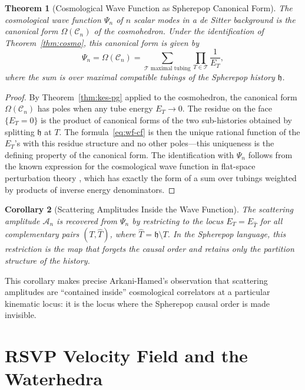 \documentclass[12pt, oneside]{amsart}
\theoremstyle{plain}
\newtheorem{theorem}{Theorem}[section]
\newtheorem{corollary}[theorem]{Corollary}
\theoremstyle{definition}
\theoremstyle{remark}
\newcommand{\hist}{\mathfrak{h}}
\newcommand{\Amp}{\mathcal{A}}
\newcommand{\WF}{\Psi}
\newcommand{\Cosmo}{\mathcal{C}_n}
\newcommand{\CF}{\Omega}   %
\begin{document}
\begin{theorem}[Cosmological Wave Function as Spherepop Canonical Form]
\label{thm:wf}
The cosmological wave function $\WF_n$ of $n$ scalar modes in a de Sitter background is the canonical form $\CF(\Cosmo)$ of the cosmohedron. Under the identification of Theorem~\ref{thm:cosmo}, this canonical form is given by
\begin{equation}
\label{eq:wf-cf}
  \Psi_n = \CF(\Cosmo) = \sum_{\mathcal{T} \text{ maximal tubing}} \prod_{T \in \mathcal{T}} \frac{1}{E_T},
\end{equation}
where the sum is over maximal compatible tubings of the Spherepop history $\hist$.
\end{theorem}

\begin{proof}
By Theorem~\ref{thm:kes-pg} applied to the cosmohedron, the canonical form $\CF(\Cosmo)$ has poles when any tube energy $E_T \to 0$. The residue on the face $\{E_T = 0\}$ is the product of canonical forms of the two sub-histories obtained by splitting $\hist$ at $T$. The formula~\eqref{eq:wf-cf} is then the unique rational function of the $E_T$'s with this residue structure and no other poles---this uniqueness is the defining property of the canonical form. The identification with $\WF_n$ follows from the known expression for the cosmological wave function in flat-space perturbation theory \cite{CCGN2021}, which has exactly the form of a sum over tubings weighted by products of inverse energy denominators.
\end{proof}

\begin{corollary}[Scattering Amplitudes Inside the Wave Function]
\label{cor:amplitudes-in-wf}
The scattering amplitude $\Amp_n$ is recovered from $\WF_n$ by restricting to the locus $E_T = E_{\hat T}$ for all complementary pairs $(T, \hat T)$, where $\hat T = \hist \setminus T$. In the Spherepop language, this restriction is the map that forgets the causal order and retains only the partition structure of the history.
\end{corollary}

This corollary makes precise Arkani-Hamed's observation that scattering amplitudes are ``contained inside'' cosmological correlators at a particular kinematic locus: it is the locus where the Spherepop causal order is made invisible.

\section{RSVP Velocity Field and the Waterhedra}
\label{sec:water}
\end{document}

